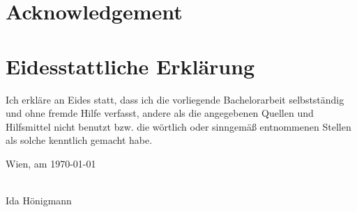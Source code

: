 \documentclass[a4paper,11pt,bibliography=totoc,listof=totoc,headinclude=true,cleardoublepage=empty]{scrbook}
\begin{document}
\cleardoublepage

\chapter*{Acknowledgement}
\thispagestyle{empty}

\cleardoublepage

\chapter*{Eidesstattliche Erkl\"arung}
\thispagestyle{empty}
\thispagestyle{empty}

\vspace*{2cm}

Ich erkl\"are an Eides statt, dass ich die vorliegende Bachelorarbeit selbstst\"andig und ohne fremde Hilfe verfasst, andere als die angegebenen Quellen und Hilfsmittel nicht benutzt bzw. die w\"ortlich oder sinngem\"a{\ss} entnommenen Stellen als solche kenntlich gemacht habe.

\vspace*{3cm}

\noindent
Wien, am \today
%
\hfill 
%
\begin{minipage}[t]{5cm}
\centering
\underline{\hspace*{5cm}}\\
\small Ida Hönigmann
\end{minipage}

\cleardoublepage


\tableofcontents

\cleardoublepage
{} 









\printbibliography
\end{document}
